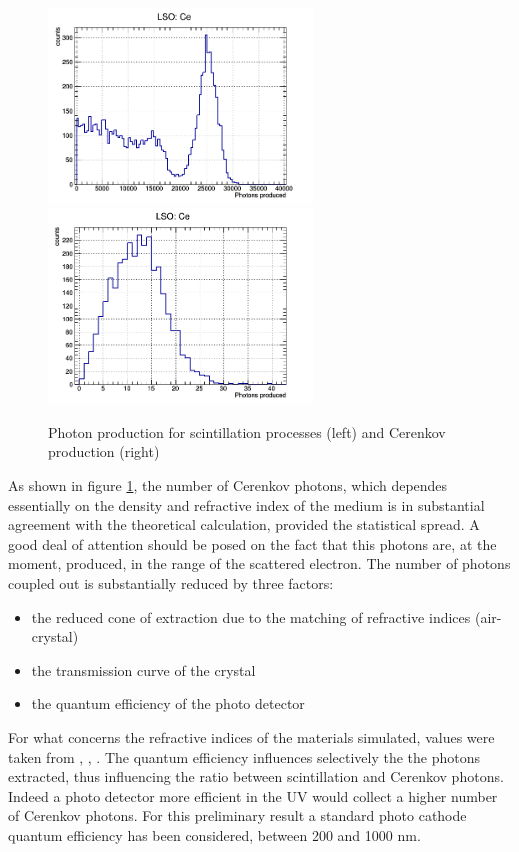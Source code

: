 \begin{figure}[htbp]
\begin{center}
\includegraphics[width=7cm]{../Pictures/Chapter_5/spctrum_LSO.png}
\includegraphics[width=7cm]{../Pictures/Chapter_5/cerenkov_LSO.png}
\end{center}
\caption[LSO photoelectric and Cerenkov production]{Photon production for scintillation processes (left) and Cerenkov production (right)}
\label{fig:ceren_phot}
\end{figure}
As shown in figure \ref{fig:ceren_phot}, the number of Cerenkov photons, which dependes essentially on the density and refractive index of the medium is in substantial agreement with the theoretical calculation, provided the statistical spread.
A good deal of attention should be posed on the fact that this photons are, at the moment, produced, in the range of the scattered electron. 
The number of photons coupled out is substantially reduced by three factors: 
\begin{itemize}
\item the reduced cone of extraction due to the matching of refractive indices (air-crystal)
\item the transmission curve of the crystal
\item the quantum efficiency of the photo detector
\end{itemize}
For what concerns the refractive indices of the materials simulated, values were taken from \cite{Auffray2009}, \cite{Kuwano2004}, \cite{jellison2012}.
The quantum efficiency influences selectively the the photons extracted, thus influencing the ratio between scintillation and Cerenkov photons. Indeed a photo detector more efficient in the UV would collect a higher number of Cerenkov photons. For this preliminary result a standard photo cathode quantum efficiency has been considered, between 200 and 1000 nm.
